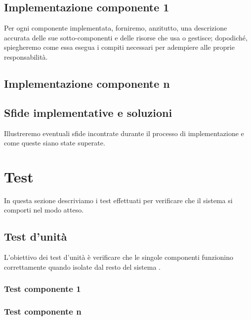 \subsection{Implementazione componente 1}

Per ogni componente implementata, forniremo, anzitutto, una descrizione accurata delle sue sotto-componenti e delle risorse che usa o gestisce; dopodiché, spiegheremo come essa esegua i compiti necessari per adempiere alle proprie responsabilità.

\subsection{Implementazione componente n}

\subsection{Sfide implementative e soluzioni}

Illustreremo eventuali sfide incontrate durante il processo di implementazione e come queste siano state superate.

\section{Test}

In questa sezione descriviamo i test effettuati per verificare che il sistema si comporti nel modo atteso.

\subsection{Test d'unit\`a}

L'obiettivo dei test d'unità è verificare che le singole componenti funzionino correttamente quando isolate dal resto del sistema \cite{bettini2021tdd}.

\subsubsection{Test componente 1}

\subsubsection{Test componente n}

